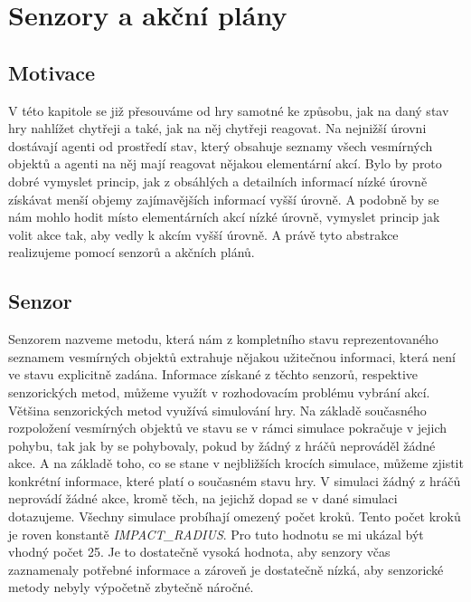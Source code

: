 \chapter{Senzory a akční plány}

\section{Motivace}
V této kapitole se již přesouváme od hry samotné ke způsobu, jak na daný stav hry nahlížet chytřeji a také, jak na něj chytřeji reagovat. 
Na nejnižší úrovni dostávají agenti od prostředí stav, který obsahuje seznamy všech vesmírných objektů a agenti na něj mají reagovat nějakou elementární akcí.
Bylo by proto dobré vymyslet princip, jak z obsáhlých a detailních informací nízké úrovně získávat menší objemy zajímavějších informací vyšší úrovně. 
A podobně by se nám mohlo hodit místo elementárních akcí nízké úrovně, vymyslet princip jak volit akce tak, aby vedly k akcím vyšší úrovně.
A právě tyto abstrakce realizujeme pomocí senzorů a akčních plánů.
\section{Senzor}

Senzorem nazveme metodu, která nám z kompletního stavu reprezentovaného seznamem vesmírných objektů extrahuje nějakou užitečnou informaci, která není ve stavu explicitně zadána.
Informace získané z těchto senzorů, respektive senzorických metod, můžeme využít v rozhodovacím problému vybrání akcí.
Většina senzorických metod využívá simulování hry. Na základě současného rozpoložení vesmírných objektů ve stavu se v rámci simulace pokračuje v jejich pohybu, tak jak by se pohybovaly, pokud by žádný z hráčů neprováděl žádné akce.
A na základě toho, co se stane v nejbližších krocích simulace, můžeme zjistit konkrétní informace, které platí o současném stavu hry.
V simulaci žádný z hráčů neprovádí žádné akce, kromě těch, na jejichž dopad se v dané simulaci dotazujeme.
Všechny simulace probíhají omezený počet kroků. Tento počet kroků je roven konstantě \emph{\uppercase{Impact\_radius}}. Pro tuto hodnotu se mi ukázal být vhodný počet 25.
Je to dostatečně vysoká hodnota, aby senzory včas zaznamenaly potřebné informace a zároveň je dostatečně nízká, aby senzorické metody nebyly výpočetně zbytečně náročné.



